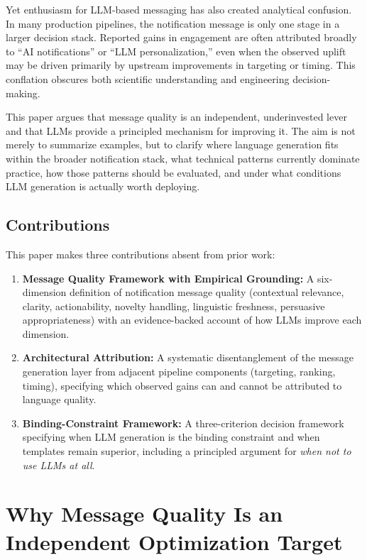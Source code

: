 \documentclass[sigconf]{acmart}
\begin{document}
Yet enthusiasm for LLM-based messaging has also created analytical confusion. In many production pipelines, the notification message is only one stage in a larger decision stack. Reported gains in engagement are often attributed broadly to ``AI notifications'' or ``LLM personalization,'' even when the observed uplift may be driven primarily by upstream improvements in targeting or timing. This conflation obscures both scientific understanding and engineering decision-making. 

This paper argues that message quality is an independent, underinvested lever and that LLMs provide a principled mechanism for improving it. The aim is not merely to summarize examples, but to clarify where language generation fits within the broader notification stack, what technical patterns currently dominate practice, how those patterns should be evaluated, and under what conditions LLM generation is actually worth deploying.

\subsection{Contributions}

This paper makes three contributions absent from prior work:

\begin{enumerate}
    \item \textbf{Message Quality Framework with Empirical Grounding:} A six-dimension definition of notification message quality (contextual relevance, clarity, actionability, novelty handling, linguistic freshness, persuasive appropriateness) with an evidence-backed account of how LLMs improve each dimension.
    \item \textbf{Architectural Attribution:} A systematic disentanglement of the message generation layer from adjacent pipeline components (targeting, ranking, timing), specifying which observed gains can and cannot be attributed to language quality.
    \item \textbf{Binding-Constraint Framework:} A three-criterion decision framework specifying when LLM generation is the binding constraint and when templates remain superior, including a principled argument for \textit{when not to use LLMs at all}.
\end{enumerate}

\section{Why Message Quality Is an Independent Optimization Target}
\end{document}
